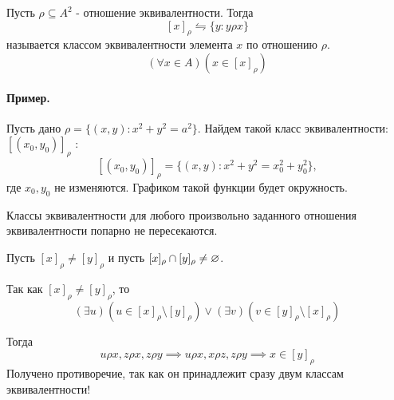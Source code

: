 \begin{definition}
Пусть $\rho \subseteq A^2$ - отношение эквивалентности. Тогда \[
	[x]_{\rho} \leftrightharpoons \{y:y\rho x\} 
\]
называется классом эквивалентности элемента $x$ по отношению  $\rho$. \[
	(\forall x \in A)(x \in [x]_{\rho})
\] 
\end{definition}

\paragraph*{Пример.}
Пусть дано $\rho = \{(x,y):x^2+y^2=a^2\}$. Найдем такой класс эквивалентности: $[(x_0,y_0)]_{\rho}$ :
\[
	[(x_0,y_0)]_{\rho} = \{(x,y): x^2+y^2=x_0^2+y_0^2\},
\]
где $x_0,y_0$ не изменяются. Графиком такой функции будет окружность.

\begin{theorem}
Классы эквивалентности для любого произвольно заданного отношения эквивалентности
попарно не пересекаются.
\end{theorem}
\begin{myproof}
	Пусть $[x]_{\rho} \neq [y]_{\rho}$ и пусть $[x]_{\rho} \cap [y]_{\rho} \neq \varnothing$.

	Так как $[x]_{\rho} \neq [y]_{\rho}$, то \[
		(\exists u)(u \in [x]_{\rho}\setminus [y]_{\rho}) \lor (\exists v)(v \in [y]_{\rho}
		\setminus [x]_{\rho})
	\] 

	Тогда \[
		u\rho x, z\rho x, z\rho y \implies u\rho x, x\rho z, z\rho y \implies x \in [y]_{\rho}
	\]
	Получено противоречие, так как он принадлежит сразу двум классам эквивалентности!
\end{myproof}


